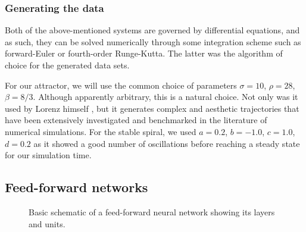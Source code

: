 \subsubsection{Generating the data}\label{sec:rk4}

Both of the above-mentioned systems are governed by differential equations, and as such, they can be solved numerically through some integration scheme such as forward-Euler or fourth-order Runge-Kutta. The latter was the algorithm of choice for the generated data sets.  

For our attractor, we will use the common choice of parameters $\sigma =10$, $\rho =28$, $\beta =8/3$. Although apparently arbitrary, this is a natural choice. Not only was it used by Lorenz himself \cite{lorenz1963deterministic}, but it generates complex and aesthetic trajectories that have been extensively investigated and benchmarked in the literature of numerical simulations. For the stable spiral, we used $a = 0.2$, $b = -1.0$, $c = 1.0$, $d = 0.2$ as it showed a good number of oscillations before reaching a steady state for our simulation time. 


\subsection{Feed-forward networks}
\begin{figure}[H]
\begin{center}
    

\end{center}

    \caption{Basic schematic of a feed-forward neural network showing its layers and units.}
    \label{fig:ffn}
\end{figure}


